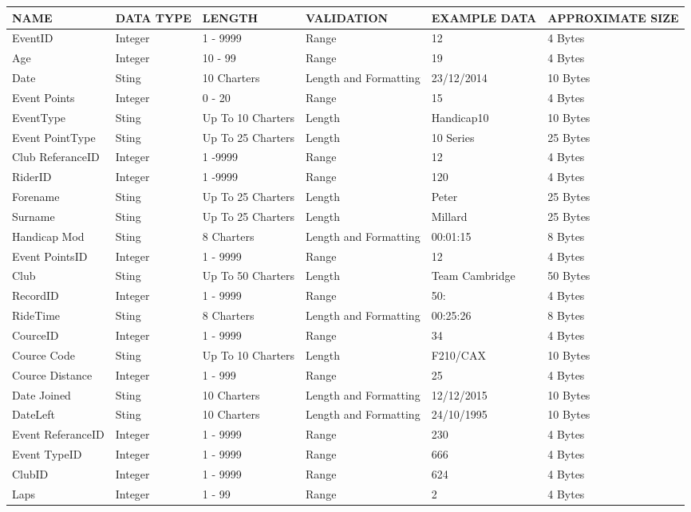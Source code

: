\begin{tabular}{|p{1.5cm}|p{1.5cm}|p{1.8cm}|p{2.1cm}|l|p{2.5cm}|}
	\hline
	NAME & DATA TYPE & LENGTH & VALIDATION & EXAMPLE DATA & APPROXIMATE SIZE \\ \hline
	EventID & Integer & 1 - 9999 & Range & 12 & 4 Bytes \\ \hline
	Age & Integer & 10 - 99  & Range & 19 & 4 Bytes \\ \hline
	Date & Sting & 10 Charters & Length and Formatting & 23/12/2014 & 10 Bytes \\ \hline
	Event Points & Integer & 0 - 20 & Range & 15 & 4 Bytes \\ \hline
	EventType & Sting & Up To 10 Charters & Length & Handicap10 & 10 Bytes \\ \hline
	Event PointType & Sting & Up To 25 Charters & Length & 10 Series & 25 Bytes \\ \hline
	Club ReferanceID & Integer & 1 -9999 & Range & 12 & 4 Bytes \\ \hline
	RiderID & Integer & 1 -9999 & Range & 120 & 4 Bytes \\ \hline
	Forename & Sting & Up To 25 Charters & Length & Peter & 25 Bytes \\ \hline
	Surname & Sting & Up To 25 Charters & Length & Millard & 25 Bytes \\ \hline
	Handicap Mod & Sting & 8 Charters & Length and Formatting & 00:01:15 & 8 Bytes \\ \hline
	Event PointsID & Integer & 1 - 9999 & Range & 12 & 4 Bytes \\ \hline
	Club & Sting & Up To 50 Charters & Length & Team Cambridge & 50 Bytes \\ \hline
	RecordID & Integer & 1 - 9999 & Range & 50: & 4 Bytes \\ \hline
	RideTime & Sting & 8 Charters & Length and Formatting & 00:25:26 & 8 Bytes \\ \hline
	CourceID & Integer & 1 - 9999 & Range & 34 & 4 Bytes \\ \hline
	Cource Code & Sting & Up To 10 Charters & Length & F210/CAX & 10 Bytes \\ \hline
	Cource Distance & Integer & 1 - 999 & Range & 25 & 4 Bytes \\ \hline
	Date Joined & Sting & 10 Charters & Length and Formatting & 12/12/2015 & 10 Bytes \\ \hline
	DateLeft & Sting & 10 Charters & Length and Formatting & 24/10/1995 & 10 Bytes \\ \hline
	Event ReferanceID & Integer & 1 - 9999 & Range & 230 & 4 Bytes \\ \hline
	Event TypeID & Integer & 1 - 9999 & Range & 666 & 4 Bytes \\ \hline
	ClubID & Integer & 1 - 9999 & Range & 624 & 4 Bytes \\ \hline
	Laps & Integer & 1 - 99 & Range & 2 & 4 Bytes \\ \hline
\end{tabular}
